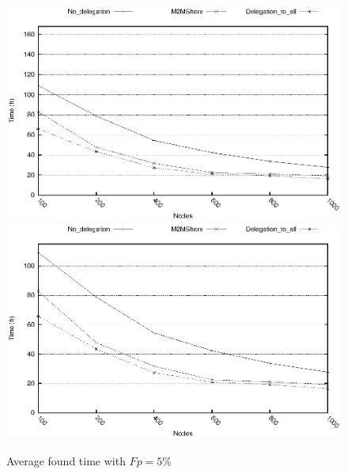 \begin{figure}[htbp]
\centering%
\subfigure%
{\includegraphics{grafici/tempiVF_Fp5.eps}}\qquad\qquad
\subfigure%
{\includegraphics{grafici/tempiVF_Fp5_zoom.eps}}
\caption{Average found time with $Fp = 5\%$\label{graficiTempiVF_Fp5}}
\end{figure}

